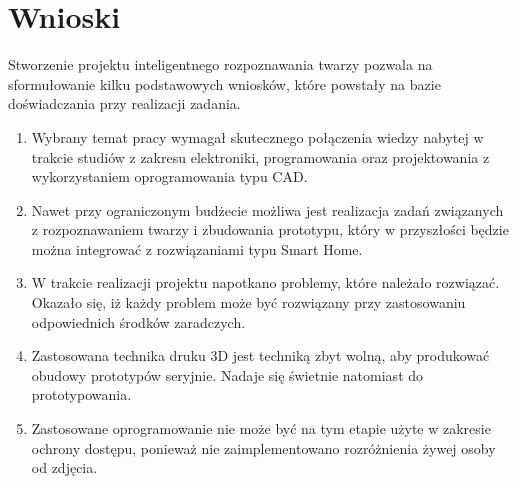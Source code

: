 \documentclass[a4paper,12pt,reqno]{article}
\begin{document}
\newpage
\section{Wnioski} \label{section:wnioski}
Stworzenie projektu inteligentnego rozpoznawania twarzy pozwala na sformułowanie kilku podstawowych wniosków, które powstały na bazie doświadczania przy realizacji zadania.

\begin{enumerate}
\item Wybrany temat pracy wymagał skutecznego połączenia wiedzy nabytej w trakcie studiów z zakresu elektroniki, programowania oraz projektowania z wykorzystaniem oprogramowania typu CAD.
\item Nawet przy ograniczonym budżecie możliwa jest realizacja zadań związanych z rozpoznawaniem twarzy i zbudowania prototypu, który w przyszłości będzie można integrować z rozwiązaniami typu Smart Home.
\item W trakcie realizacji projektu napotkano problemy, które należało rozwiązać. Okazało się, iż każdy problem może być rozwiązany przy zastosowaniu odpowiednich środków zaradczych.
\item Zastosowana technika druku 3D jest techniką zbyt wolną, aby produkować obudowy prototypów seryjnie. Nadaje się świetnie natomiast do prototypowania.
\item Zastosowane oprogramowanie nie może być na tym etapie użyte w zakresie ochrony dostępu, ponieważ nie zaimplementowano rozróżnienia żywej osoby od zdjęcia.
\end{enumerate}

\newpage



\end{document}
